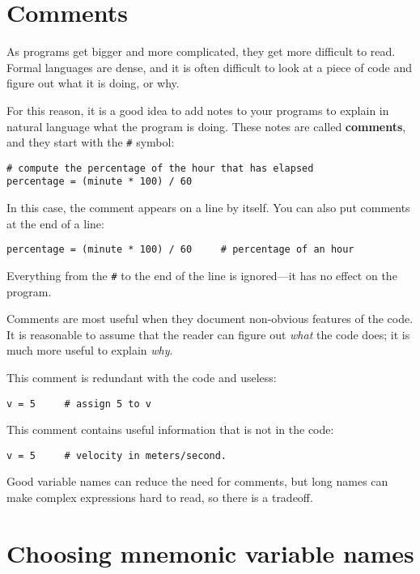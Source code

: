 

\section{Comments}

As programs get bigger and more complicated, they get more difficult
to read.  Formal languages are dense, and it is often difficult to
look at a piece of code and figure out what it is doing, or why.

For this reason, it is a good idea to add notes to your programs to explain
in natural language what the program is doing.  These notes are called
{\bf comments}, and they start with the \verb"#" symbol:

\beforeverb
\begin{verbatim}
# compute the percentage of the hour that has elapsed
percentage = (minute * 100) / 60
\end{verbatim}
\afterverb
%
In this case, the comment appears on a line by itself.  You can also put
comments at the end of a line:

\beforeverb
\begin{verbatim}
percentage = (minute * 100) / 60     # percentage of an hour
\end{verbatim}
\afterverb
%
Everything from the {\tt \#} to the end of the line is ignored---it
has no effect on the program.

Comments are most useful when they document non-obvious features of
the code.  It is reasonable to assume that the reader can figure out
\emph{what} the code does; it is much more useful to explain \emph{why}.

This comment is redundant with the code and useless:

\beforeverb
\begin{verbatim}
v = 5     # assign 5 to v
\end{verbatim}
\afterverb
%
This comment contains useful information that is not in the code:

\beforeverb
\begin{verbatim}
v = 5     # velocity in meters/second. 
\end{verbatim}
\afterverb
%
Good variable names can reduce the need for comments, but
long names can make complex expressions hard to read, so there is
a tradeoff.

\section{Choosing mnemonic variable names}

